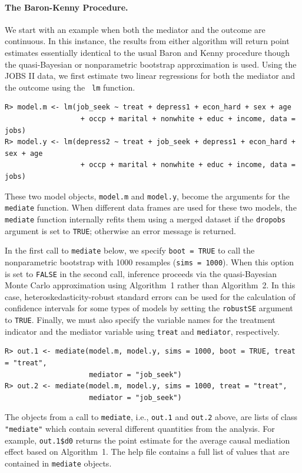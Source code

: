 \documentclass[11pt,letterpaper]{article}
\theoremstyle{plain}
\begin{document}
\paragraph{The Baron-Kenny Procedure.}
We start with an example when both the mediator and the outcome are
continuous.  In this instance, the results from either algorithm will
return point estimates essentially identical to the usual Baron and
Kenny procedure though the quasi-Bayesian or nonparametric bootstrap
approximation is used.  Using the JOBS II data, we first estimate two
linear regressions for both the mediator and the outcome using the {\tt
lm} function.
\begin{verbatim}
R> model.m <- lm(job_seek ~ treat + depress1 + econ_hard + sex + age
                  + occp + marital + nonwhite + educ + income, data = jobs)
R> model.y <- lm(depress2 ~ treat + job_seek + depress1 + econ_hard + sex + age
                  + occp + marital + nonwhite + educ + income, data = jobs)
\end{verbatim}
These two model objects, {\tt model.m} and {\tt model.y}, become the
arguments for the \texttt{mediate} function.  When different data frames
are used for these two models, the {\tt mediate} function internally refits
them using a merged dataset if the {\tt dropobs} argument is set to
{\tt TRUE}; otherwise an error message is returned.

In the first call to \texttt{mediate} below, we specify \texttt{boot
  = TRUE} to call the nonparametric bootstrap with 1000 resamples
({\tt sims = 1000}). When this option is set to {\tt FALSE} in the second
call, inference proceeds via the quasi-Bayesian Monte Carlo
approximation using Algorithm~1 rather than Algorithm~2.  In this case,
heteroskedasticity-robust standard errors can be used for the calculation of
confidence intervals for some types of models by setting the {\tt robustSE}
argument to {\tt TRUE}.  Finally, we must also
specify the variable names for the treatment indicator and the
mediator variable using {\tt treat} and {\tt mediator}, respectively.
\begin{verbatim}
R> out.1 <- mediate(model.m, model.y, sims = 1000, boot = TRUE, treat = "treat",
                    mediator = "job_seek")
R> out.2 <- mediate(model.m, model.y, sims = 1000, treat = "treat",
                    mediator = "job_seek")
\end{verbatim}
The objects from a call to \texttt{mediate}, i.e., {\tt out.1} and
{\tt out.2} above, are lists of class {\tt "mediate"} which contain several different
quantities from the analysis.  For example, \texttt{out.1\$d0} returns
the point estimate for the average causal mediation effect based on
Algorithm~1.  The help file contains a full list of values that are
contained in \texttt{mediate} objects.
\end{document}
